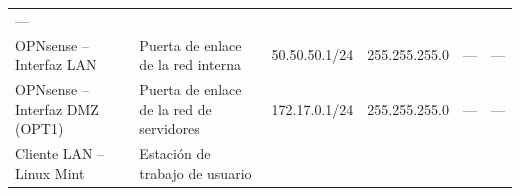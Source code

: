 \documentclass{article}
\renewcommand{\_}{\oldunderscore\hskip0pt\relax}
\begin{document}
{\begin{longtable}[]{@{}llllll@{}}
\begin{minipage}[t]{0.118\columnwidth}
---\strut
\end{minipage}\tabularnewline
\begin{minipage}[t]{0.168\columnwidth}\raggedright
OPNsense -- Interfaz LAN\strut
\end{minipage} & \begin{minipage}[t]{0.143\columnwidth}\raggedright
Puerta de enlace de la red interna\strut
\end{minipage} & \begin{minipage}[t]{0.151\columnwidth}\raggedright
50.50.50.1/24\strut
\end{minipage} & \begin{minipage}[t]{0.155\columnwidth}\raggedright
255.255.255.0\strut
\end{minipage} & \begin{minipage}[t]{0.134\columnwidth}\raggedright
---\strut
\end{minipage} & \begin{minipage}[t]{0.118\columnwidth}\raggedright
---\strut
\end{minipage}\tabularnewline
\begin{minipage}[t]{0.168\columnwidth}\raggedright
OPNsense -- Interfaz DMZ (OPT1)\strut
\end{minipage} & \begin{minipage}[t]{0.143\columnwidth}\raggedright
Puerta de enlace de la red de servidores\strut
\end{minipage} & \begin{minipage}[t]{0.151\columnwidth}\raggedright
172.17.0.1/24\strut
\end{minipage} & \begin{minipage}[t]{0.155\columnwidth}\raggedright
255.255.255.0\strut
\end{minipage} & \begin{minipage}[t]{0.134\columnwidth}\raggedright
---\strut
\end{minipage} & \begin{minipage}[t]{0.118\columnwidth}\raggedright
---\strut
\end{minipage}\tabularnewline
\begin{minipage}[t]{0.168\columnwidth}\raggedright
Cliente LAN -- Linux Mint\strut
\end{minipage} & \begin{minipage}[t]{0.143\columnwidth}\raggedright
Estación de trabajo de usuario\strut
\end{minipage} & \begin{minipage}[t]{0.151\columnwidth}\raggedright

\end{minipage}
\end{longtable}}
\end{document}
